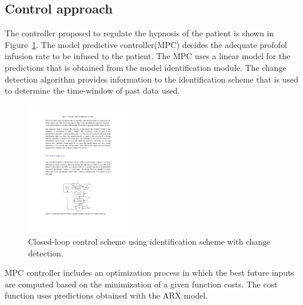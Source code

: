 \subsection{Control approach}
The controller proposed to regulate the hypnosis of the patient is shown in Figure~\ref{fig:Controller}.
%
The model predictive controller(MPC) decides the adequate profofol infusion rate to be infused to the patient.
%
The MPC uses a linear model for the predictions that is obtained from the model identification module.
%
The change detection algorithm provides information to the identification scheme that is used to determine the time-window of
past data used.
\begin{figure}[htb!]
\centering
\includegraphics[width=0.40\textwidth]{./pics/aclac_paper/Controller.pdf}
\caption{Closed-loop control scheme using identification scheme with change detection.}
\label{fig:Controller}
\end{figure}
MPC controller includes an optimization process in which the best
future inputs are computed based on the minimization of a given
function costs. The cost function uses predictions obtained with the ARX model.

